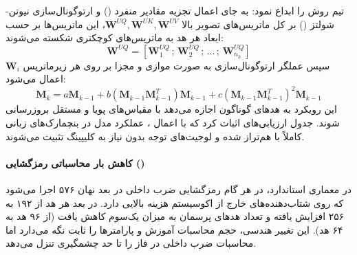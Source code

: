 تیم  روش  را ابداع نمود:
به جای اعمال تجزیه مقادیر منفرد () و ارتوگونال‌سازی نیوتن-شولتز () بر کل ماتریس‌های تصویر بالا $\mathbf{W}^{UQ}, \mathbf{W}^{UK}, \mathbf{W}^{UV}$، این ماتریس‌ها بر حسب ابعاد هر هد به ماتریس‌های کوچکتری شکسته می‌شوند:
\begin{equation}
    \mathbf{W}^{UQ} = \left[ \mathbf{W}_1^{UQ} \,;\, \mathbf{W}_2^{UQ} \,;\, \dots \,;\, \mathbf{W}_{n_h}^{UQ} \right]
\end{equation}
سپس عملگر ارتوگونال‌سازی به صورت موازی و مجزا بر روی هر زیرماتریس $\mathbf{W}_i$ اعمال می‌شود:
\begin{equation}
    \mathbf{M}_k = a\mathbf{M}_{k-1} + b(\mathbf{M}_{k-1}\mathbf{M}_{k-1}^T)\mathbf{M}_{k-1} + c(\mathbf{M}_{k-1}\mathbf{M}_{k-1}^T)^2\mathbf{M}_{k-1}
\end{equation}
این رویکرد به هدهای گوناگون اجازه می‌دهد با مقیاس‌های پویا و مستقل بروزرسانی شوند. جدول ارزیابی‌های  اثبات کرد که با اعمال ، عملکرد مدل  در بنچمارک‌های زبانی کاملاً با  هم‌تراز شده و لوجیت‌های توجه بدون نیاز به کلیپینگ تثبیت می‌شوند.

\paragraph*{کاهش بار محاسباتی رمزگشایی ()}
در معماری  استاندارد، در هر گام رمزگشایی ضرب داخلی در بعد نهان ۵۷۶ اجرا می‌شود که روی شتاب‌دهنده‌های خارج از اکوسیستم  هزینه بالایی دارد. در  بعد هر هد از ۱۹۲ به ۲۵۶ افزایش یافته و تعداد هدهای پرسمان به میزان یک‌سوم کاهش یافت (از ۹۶ هد به ۶۴ هد). این تغییر هندسی، حجم محاسبات آموزش و پارامترها را ثابت نگه می‌دارد اما محاسبات ضرب داخلی در فاز  را تا حد چشمگیری تنزل می‌دهد.

